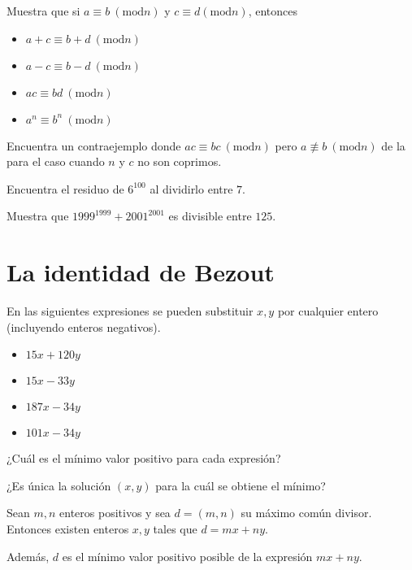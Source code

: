 \begin{ejercicio}
Muestra que si $a\equiv b ~(\mathrm {mod} n)$  y $c\equiv d (\mathrm {mod} n)$, entonces
\begin{itemize}
    \item $a+ c\equiv b+ d ~(\mathrm {mod} n)$
    \item $a- c\equiv b- d ~(\mathrm {mod} n)$
    \item $ac\equiv bd ~(\mathrm {mod} n)$
    \item $a^n\equiv b^n ~(\mathrm {mod} n)$
\end{itemize}
\end{ejercicio}

\begin{ejercicio}
Encuentra un contraejemplo donde $ac\equiv bc ~(\mathrm {mod} n)$ pero $a\nequiv b ~(\mathrm {mod} n)$ de la para el caso cuando $n$ y $c$ no son coprimos.
\end{ejercicio}

\begin{ejercicio}
  Encuentra el residuo de $6^{100}$ al dividirlo entre $7$.
\end{ejercicio}

\begin{ejercicio}
  Muestra que $1999^{1999}+2001^{2001}$ es divisible entre $125$.
\end{ejercicio}

\section{La identidad de Bezout} 

\begin{ejercicio}
En las siguientes expresiones se pueden substituir $x,y$ por cualquier entero (incluyendo enteros negativos). 
  
\begin{itemize}
      \item $15x +120y$
      \item $15x -33y$
      \item $187x -34y$
      \item $101x -34y$
\end{itemize}
  
  ¿Cuál es el mínimo valor positivo para cada expresión? 
  
  ¿Es única la solución $(x,y)$ para la cuál se obtiene el mínimo?  
\end{ejercicio}

\begin{proposicion}
Sean $m,n$ enteros positivos y sea $d=(m,n)$ su máximo común divisor. Entonces existen enteros $x,y$ tales que $d=mx+ny$.

Además, $d$ es el mínimo valor positivo posible de la expresión $mx+ny$.
\end{proposicion}

